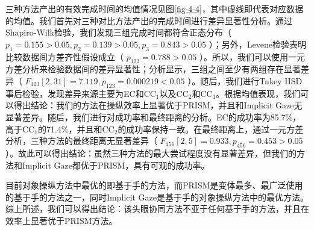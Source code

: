 三种方法产出的有效完成时间的均值情况见图\ref{fig-4-4}，其中虚线即代表对应数据的均值。我们首先对三种对比方法产出的完成时间进行差异显著性分析。通过Shapiro-Wilk检验，我们发现三组完成时间都符合正态分布（ $p_1 = 0.155 > 0.05, p_2 = 0.139 > 0.05, p_3 = 0.843 > 0.05$ ）；另外，Levene检验表明比较数据间方差齐性假设成立（ $p_{123} = 0.788 > 0.05$ ）。所以，我们可以使用一元方差分析来检验数据间的差异显著性；分析显示，三组之间至少有两组存在显著差异（ $F_{123}[2, 31] = 7.119, p_{123} = 0.000219 < 0.05$ ）。随后，我们进行Tukey HSD事后检验，发现差异来源主要为EC和CC$_1$以及CC$_2$和CC$_1$。根据均值表现，我们可以得出结论：我们的方法在操纵效率上显著优于PRISM，并且和Implicit Gaze无显著差异。随后，我们进行对成功率和最终距离的分析。EC的成功率为85.7\%，高于CC$_1$的71.4\%，并且和CC$_2$的成功率保持一致。在最终距离上，通过一元方差分析，三种方法的最终距离无显著差异（ $F_{456}[2, 5] = 0.933, p_{456} = 0.453 > 0.05$ ）。故此可以得出结论：虽然三种方法的最大尝试程度没有显著差异，但我们的方法和Implicit Gaze都优于PRISM，具有可观的成功率。

目前对象操纵方法中最优的即基于手的方法，而PRISM是变体最多、最广泛使用的基于手的方法之一，同时Implicit Gaze是基于手的对象操纵方法中的最优方法。综上所述，我们可以得出结论：该头眼协同方法不亚于任何基于手的方法，并且在效率上显著优于PRISM方法。

